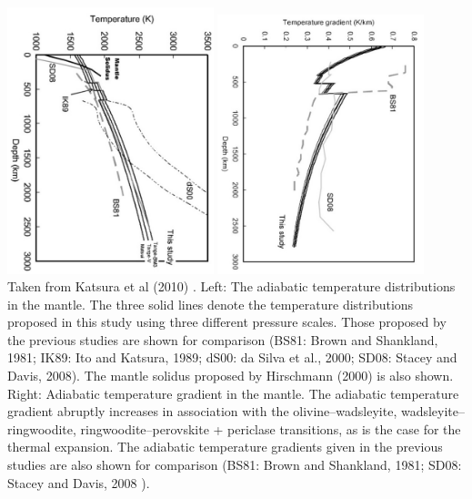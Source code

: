 \begin{center}
\includegraphics[width=6cm]{images/adiabatic/kayy10a}
\includegraphics[width=6cm]{images/adiabatic/kayy10b}\\
{\captionfont Taken from Katsura et al (2010) \cite{kayy10}.
Left: The adiabatic temperature distributions in the mantle. The three solid lines
denote the temperature distributions proposed in this study using three different
pressure scales. Those proposed by the previous studies are shown for comparison
(BS81: Brown and Shankland, 1981; IK89: Ito and Katsura, 1989; dS00: da Silva et al.,
2000; SD08: Stacey and Davis, 2008). The mantle solidus proposed by Hirschmann
(2000) is also shown.
Right:
Adiabatic temperature gradient in the mantle. The adiabatic temperature gradient 
abruptly increases in association with the olivine–wadsleyite,
wadsleyite–ringwoodite, ringwoodite–perovskite + periclase transitions, as is the
case for the thermal expansion. The adiabatic temperature gradients given in the
previous studies are also shown for comparison (BS81: Brown and Shankland, 1981;
SD08: Stacey and Davis, 2008 \cite{stacey_davis}).
}
\end{center}


